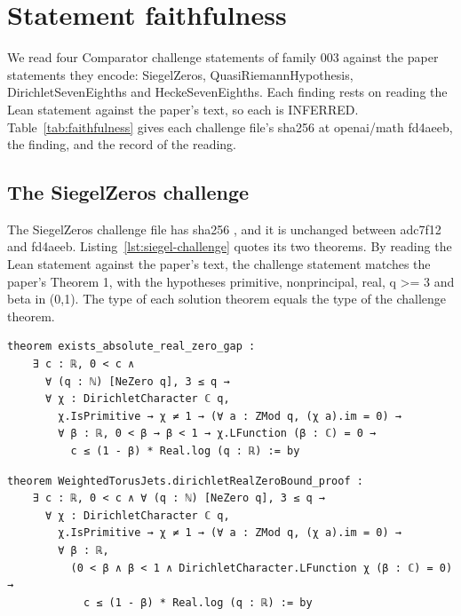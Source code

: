 \section{Statement faithfulness}\label{sec:faithfulness}

We read four Comparator challenge statements of family 003 against the paper statements they encode: SiegelZeros, QuasiRiemannHypothesis, DirichletSevenEighths and HeckeSevenEighths.
Each finding rests on reading the Lean statement against the paper's text, so each is INFERRED.
Table~\ref{tab:faithfulness} gives each challenge file's sha256 at openai/math fd4aeeb, the finding, and the record of the reading.

\subsection{The SiegelZeros challenge}

The SiegelZeros challenge file has sha256 , and it is unchanged between adc7f12 and fd4aeeb.
Listing~\ref{lst:siegel-challenge} quotes its two theorems.
By reading the Lean statement against the paper's text, the challenge statement matches the paper's Theorem 1, with the hypotheses primitive, nonprincipal, real, q >= 3 and beta in (0,1).
The type of each solution theorem equals the type of the challenge theorem.

\begin{listing}[tbp]
\caption{The SiegelZeros challenge, lean/ComparatorChallenges/SiegelZeros.lean:8-14 and 19-25 (openai/math fd4aeeb; file sha256 bedaac02\ldots, unchanged since adc7f12).}\label{lst:siegel-challenge}
\begin{Verbatim}
theorem exists_absolute_real_zero_gap :
    ∃ c : ℝ, 0 < c ∧
      ∀ (q : ℕ) [NeZero q], 3 ≤ q →
      ∀ χ : DirichletCharacter ℂ q,
        χ.IsPrimitive → χ ≠ 1 → (∀ a : ZMod q, (χ a).im = 0) →
        ∀ β : ℝ, 0 < β → β < 1 → χ.LFunction (β : ℂ) = 0 →
          c ≤ (1 - β) * Real.log (q : ℝ) := by
\end{Verbatim}
\begin{Verbatim}
theorem WeightedTorusJets.dirichletRealZeroBound_proof :
    ∃ c : ℝ, 0 < c ∧ ∀ (q : ℕ) [NeZero q], 3 ≤ q →
      ∀ χ : DirichletCharacter ℂ q,
        χ.IsPrimitive → χ ≠ 1 → (∀ a : ZMod q, (χ a).im = 0) →
        ∀ β : ℝ,
          (0 < β ∧ β < 1 ∧ DirichletCharacter.LFunction χ (β : ℂ) = 0) →
            c ≤ (1 - β) * Real.log (q : ℝ) := by
\end{Verbatim}
\end{listing}

